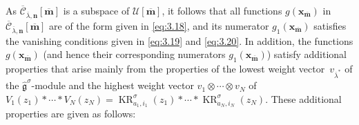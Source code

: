\documentclass[10pt,a4paper]{amsart}
\numberwithin{equation}{section}
\DeclareMathOperator{\KR}{KR}
\begin{document}
As $\overline{\mathcal{C}}_{\overline{\lambda},\mathbf{n}}[\overline{\mathbf{m}}]$ is a subspace of $\mathcal{U}[\overline{\mathbf{m}}]$, it follows that all functions $g(\mathbf{x}_{\overline{\mathbf{m}}})$ in $\overline{\mathcal{C}}_{\overline{\lambda},\mathbf{n}}[\overline{\mathbf{m}}]$ are of the form given in \eqref{eq:3.18}, and its numerator $g_1(\mathbf{x}_{\overline{ \mathbf{m}}})$ satisfies the vanishing conditions given in \eqref{eq:3.19} and \eqref{eq:3.20}. In addition, the functions $g(\mathbf{x}_{\overline{\mathbf{m}}})$ (and hence their corresponding numerators $g_1(\mathbf{x}_{\overline{ \mathbf{m}}})$) satisfy additional properties that arise mainly from the properties of the lowest weight vector~$v_{\overline{\lambda}^*}$ of the $\widehat{\mathfrak{g}}^{ \sigma}$-module  and the highest weight vector $v_1\otimes\cdots\otimes v_N$ of $V_1(z_1)*\cdots*V_N(z_N)=\KR_{a_1,i_1}^{\sigma}(z_1)*\cdots* \KR_{a_N,i_N}^{\sigma}(z_N)$. These additional properties are given as follows:
\end{document}
